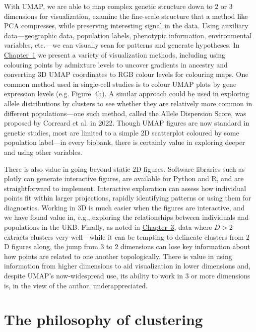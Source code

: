 With UMAP, we are able to map complex genetic structure down to $2$ or $3$ dimensions for visualization, examine the fine-scale structure that a method like PCA compresses, while preserving interesting signal in the data. Using auxiliary data---geographic data, population labels, phenotypic information, environmental variables, etc.---we can visually scan for patterns and generate hypotheses. In \hyperref[chap:chapter1]{Chapter~1} we present a variety of visualization methods, including using colouring points by admixture levels to uncover gradients in ancestry and converting 3D UMAP coordinates to RGB colour levels for colouring maps. One common method used in single-cell studies is to colour UMAP plots by gene expression levels (e.g. \citep{jessa_stalled_2019} Figure~4h). A similar approach could be used in exploring allele distributions by clusters to see whether they are relatively more common in different populations---one such method, called the Allele Dispersion Score, was proposed by Correard et al. in 2022\citep{correard_allele_2022}. Though UMAP figures are now standard in genetic studies, most are limited to a simple 2D scatterplot coloured by some population label---in every biobank, there is certainly value in exploring deeper and using other variables.

There is also value in going beyond static $2$D figures. Software libraries such as plotly\citep{plotly} can generate interactive figures, are available for Python and R, and are straightforward to implement. Interactive exploration can assess how individual points fit within larger projections, rapidly identifying patterns or using them for diagnostics. Working in $3$D is much easier when the figures are interactive, and we have found value in, e.g., exploring the relationships between individuals and populations in the UKB. Finally, as noted in \hyperref[chap:chapter3]{Chapter~3}, data where $D > 2$ extracts clusters very well---while it can be tempting to delineate clusters from $2$D figures along, the jump from $3$ to $2$ dimensions can lose key information about how points are related to one another topologically. There is value in using information from higher dimensions to aid visualization in lower dimensions and, despite UMAP's now-widespread use, its ability to work in $3$ or more dimensions is, in the view of the author, underappreciated.

\section{The philosophy of clustering}

